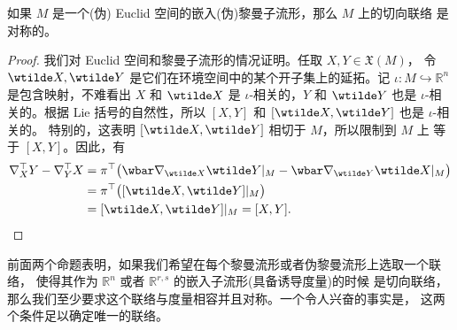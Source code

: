 \begin{proposition}
  如果 $M$ 是一个(伪) Euclid 空间的嵌入(伪)黎曼子流形，那么 $M$ 上的切向联络
  是对称的。
\end{proposition}
\begin{proof}
  我们对 Euclid 空间和黎曼子流形的情况证明。任取 $X,Y\in \mathfrak X(M)$，
  令 $\wtilde X,\wtilde Y$ 是它们在环境空间中的某个开子集上的延拓。记
  $\iota:M\hookrightarrow \mathbb{R}^n$ 是包含映射，不难看出
  $X$ 和 $\wtilde X$ 是 $\iota$-相关的，$Y$ 和 $\wtilde Y$ 也是 $\iota$-相关的。根据
  Lie 括号的自然性，所以 $[X,Y]$ 和 $[\wtilde X,\wtilde Y]$ 也是 $\iota$-相关的。
  特别的，这表明 $[\wtilde X,\wtilde Y]$ 相切于 $M$，所以限制到 $M$ 上
  等于 $[X,Y]$。因此，有
  \begin{align*}
    \nabla_X^\top Y-\nabla_Y^\top X&=\pi^\top
    \bigl(
      \wbar \nabla_{\wtilde X}\wtilde Y|_M
      -\wbar \nabla_{\wtilde Y}\wtilde X|_M
    \bigr)\\
    &=\pi^\top\bigl([\wtilde X,\wtilde Y]|_M\bigr)\\
    &=[\wtilde X,\wtilde Y]|_M=[X,Y].\qedhere
  \end{align*}
\end{proof}

前面两个命题表明，如果我们希望在每个黎曼流形或者伪黎曼流形上选取一个联络，
使得其作为 $\mathbb{R}^n$ 或者 $\mathbb{R}^{r,s}$ 的嵌入子流形(具备诱导度量)的时候
是切向联络，那么我们至少要求这个联络与度量相容并且对称。一个令人兴奋的事实是，
这两个条件足以确定唯一的联络。

